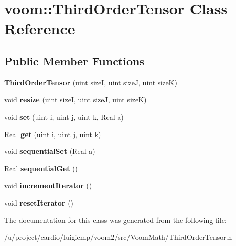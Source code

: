 \hypertarget{classvoom_1_1_third_order_tensor}{
\section{voom::ThirdOrderTensor Class Reference}
\label{classvoom_1_1_third_order_tensor}
}
\subsection*{Public Member Functions}
\begin{DoxyCompactItemize}
\item 
\hypertarget{classvoom_1_1_third_order_tensor_a12696b5c439afe17db64a0aadc53589e}{
{\bfseries ThirdOrderTensor} (uint sizeI, uint sizeJ, uint sizeK)}
\label{classvoom_1_1_third_order_tensor_a12696b5c439afe17db64a0aadc53589e}

\item 
\hypertarget{classvoom_1_1_third_order_tensor_aa28ef3ba14892c0bc55a63658b802b78}{
void {\bfseries resize} (uint sizeI, uint sizeJ, uint sizeK)}
\label{classvoom_1_1_third_order_tensor_aa28ef3ba14892c0bc55a63658b802b78}

\item 
\hypertarget{classvoom_1_1_third_order_tensor_a1bdd0a1c84c46a7cc41ef9ede607bb9d}{
void {\bfseries set} (uint i, uint j, uint k, Real a)}
\label{classvoom_1_1_third_order_tensor_a1bdd0a1c84c46a7cc41ef9ede607bb9d}

\item 
\hypertarget{classvoom_1_1_third_order_tensor_a5d16ec7a14cfb36f8e2d1a9b49fa366f}{
Real {\bfseries get} (uint i, uint j, uint k)}
\label{classvoom_1_1_third_order_tensor_a5d16ec7a14cfb36f8e2d1a9b49fa366f}

\item 
\hypertarget{classvoom_1_1_third_order_tensor_ad83f78a740f9420e7515fb004434724e}{
void {\bfseries sequentialSet} (Real a)}
\label{classvoom_1_1_third_order_tensor_ad83f78a740f9420e7515fb004434724e}

\item 
\hypertarget{classvoom_1_1_third_order_tensor_a8bd25cbcbbea8fa5aff5335faaea3213}{
Real {\bfseries sequentialGet} ()}
\label{classvoom_1_1_third_order_tensor_a8bd25cbcbbea8fa5aff5335faaea3213}

\item 
\hypertarget{classvoom_1_1_third_order_tensor_ab3bd9676e0c91c05d831e1ead4a21da5}{
void {\bfseries incrementIterator} ()}
\label{classvoom_1_1_third_order_tensor_ab3bd9676e0c91c05d831e1ead4a21da5}

\item 
\hypertarget{classvoom_1_1_third_order_tensor_a2c6a041c88f86f0c6b30f870af178624}{
void {\bfseries resetIterator} ()}
\label{classvoom_1_1_third_order_tensor_a2c6a041c88f86f0c6b30f870af178624}

\end{DoxyCompactItemize}


The documentation for this class was generated from the following file:\begin{DoxyCompactItemize}
\item 
/u/project/cardio/luigiemp/voom2/src/VoomMath/ThirdOrderTensor.h\end{DoxyCompactItemize}
